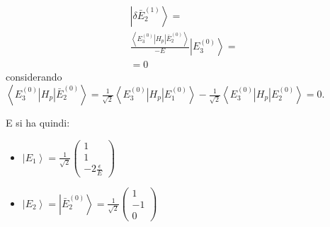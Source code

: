 \begin{equation}\begin{split}
\left |\delta\bar E_2^{\left(1\right)} \right\rangle=\\
\frac{\left\langle E_3^{\left(0\right)}|H_p|\bar E_2^{\left(0\right)} \right\rangle}{-E}\left |E_3^{\left(0\right)} \right\rangle=\\
=0
\end{split}\end{equation}
considerando $\left\langle E_3^{\left(0\right)}|H_p|\bar E_2^{\left(0\right)} \right\rangle=\frac{1}{\sqrt{2}}\left\langle E_3^{\left(0\right)}|H_p| E_1^{\left(0\right)} \right\rangle-\frac{1}{\sqrt{2}}\left\langle E_3^{\left(0\right)}|H_p| E_2^{\left(0\right)} \right\rangle=0$.

E si ha quindi:
\begin{itemize}
\item $\left |E_1 \right\rangle=\frac{1}{\sqrt{2}}\left(\begin{matrix}1\\1\\-2\frac{\epsilon}{E}\end{matrix}\right)$
\item $\left |E_2 \right\rangle=\left |\bar E_2^{\left(0\right)} \right\rangle=\frac{1}{\sqrt{2}}\left(\begin{matrix}1\\-1\\0\end{matrix}\right)$
\end{itemize}


